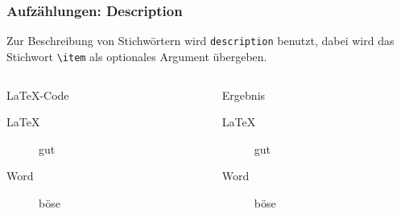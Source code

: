 \begin{frame}[fragile]
    \frametitle{Aufzählungen: Description}
    Zur Beschreibung von Stichwörtern wird \texttt{description} benutzt, dabei wird das
    Stichwort \verb-\item- als optionales Argument übergeben.
    \begin{columns}[t]
        \begin{column}{0.47\textwidth}
            \begin{block}{\LaTeX-Code}
                \begin{lstverbatim}
                \begin{description}
                    \item[\LaTeX] gut
                    \item[Word] böse
                \end{description}
                \end{lstverbatim}
            \end{block}
        \end{column}
        \begin{column}{0.47\textwidth}
            \begin{block}{Ergebnis}
                \begin{description}
                    \item[\LaTeX] gut
                    \item[Word] böse
                \end{description}
            \end{block}
        \end{column}
    \end{columns}
\end{frame}
